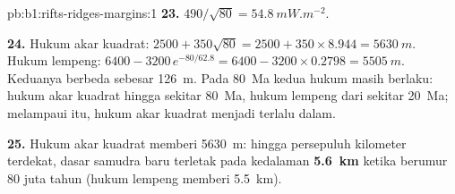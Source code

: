 \begin{solution}{pb:b1:rifts-ridges-margins:1}
\textbf{23.} $490/\sqrt{80} = \qty{54.8}{mW.m^{-2}}$.

\textbf{24.} Hukum akar kuadrat: $2500 + 350\sqrt{80} = 2500 + 350\times8.944 =
\qty{5630}{m}$. Hukum lempeng: $6400 - 3200\,e^{-80/62.8} = 6400 - 3200\times0.2798
= \qty{5505}{m}$. Keduanya berbeda sebesar \qty{126}{m}. Pada \qty{80}{Ma} kedua hukum
masih berlaku: hukum akar kuadrat hingga sekitar \qty{80}{Ma}, hukum lempeng dari sekitar
\qty{20}{Ma}; melampaui itu, hukum akar kuadrat menjadi terlalu dalam.

\textbf{25.} Hukum akar kuadrat memberi \qty{5630}{m}: hingga persepuluh kilometer
terdekat, dasar samudra baru terletak pada kedalaman
\textbf{\qty[text-series-to-math=true]{5.6}{km}} ketika berumur 80 juta tahun
(hukum lempeng memberi \qty{5.5}{km}).
\end{solution}
